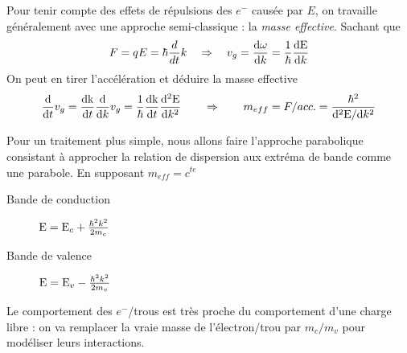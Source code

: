 	Pour tenir compte des effets de répulsions des $e^-$ causée par $E$, on travaille généralement
	avec une approche semi-classique : la \textit{masse effective}. Sachant que 
	\begin{equation}
	F = qE = \hbar\frac{d}{dt}k\quad\Rightarrow\quad v_g = \frac{{{\rm{d}}\omega }}{{{\rm{d}}k}} =
	\frac{1}{\hbar }\frac{{{\rm{dE}}}}{{{\rm{d}}k}}
	\end{equation}
	On peut en tirer l'accélération et déduire la masse effective
	\begin{equation}
	\frac{{\rm{d}}}{{{\rm{d}}t}}{v_g} = \frac{{{\rm{dk}}}}{{{\rm{d}}t}}\frac{{\rm{d}}}{{{\rm{d}}k}}{v_g} = \frac{1}{\hbar }\frac{{{\rm{dk}}}}{{{\rm{d}}t}}\frac{{{{\rm{d}}^2}{\rm{E}}}}{{{\rm{d}}{k^2}}}
	\qquad\Rightarrow\qquad {m_{eff}} = F/acc. = \frac{{{\hbar ^2}}}{{{{\rm{d}}^2}{\rm{E/d}}{k^2}}}
	\end{equation}
	
	Pour un traitement plus simple, nous allons faire l'approche parabolique consistant à approcher 
	la relation de dispersion aux extréma de bande comme une parabole. En supposant $m_{eff}=c^{te}$
	\begin{description}
	\item[Bande de conduction] ${\rm{E}} = {{\rm{E}}_c} + \frac{{{\hbar ^2}{k^2}}}{{2{m_c}}}$
	\item[Bande de valence] ${\rm{E}} = {{\rm{E}}_v} - \frac{{{\hbar ^2}{k^2}}}{{2{m_v}}}$
	\end{description}
	Le comportement des $e^-$/trous est très proche du comportement d'une charge libre : on va 
	remplacer la vraie masse de l'électron/trou par $m_c/m_v$ pour modéliser leurs interactions.
	
	
